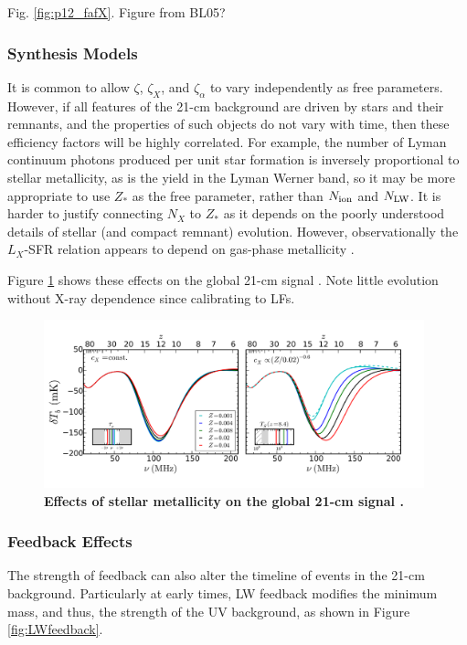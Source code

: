{\color{red} Fig. \ref{fig:p12_fafX}. Figure from BL05?}


\subsubsection{Synthesis Models}
It is common to allow $\zeta$, $\zeta_X$, and $\zeta_{\alpha}$ to vary independently as free parameters. However, if all features of the 21-cm background are driven by stars and their remnants, and the properties of such objects do not vary with time, then these efficiency factors will be highly correlated. For example, the number of Lyman continuum photons produced per unit star formation is inversely proportional to stellar metallicity, as is the yield in the Lyman Werner band, so it may be more appropriate to use $Z_{\ast}$ as the free parameter, rather than $N_{\text{ion}}$ and $N_{\text{LW}}$. It is harder to justify connecting $N_X$ to $Z_{\ast}$ as it depends on the poorly understood details of stellar (and compact remnant) evolution. However, observationally the $L_X$-SFR relation appears to depend on gas-phase metallicity \cite{Brorby2016}. 

Figure \ref{fig:gs_metallicity} shows these effects on the global 21-cm signal \cite{Mirocha2017}. {\color{red} Note little evolution without X-ray dependence since calibrating to LFs.}

\begin{figure}[]
\begin{center}
\includegraphics[width=0.98\textwidth]{Mirocha/mirocha2017_fig5.pdf}
\end{center}
\caption{{\bf Effects of stellar metallicity on the global 21-cm signal \cite{Mirocha2017}.}}
\label{fig:gs_metallicity}
\end{figure}


\subsubsection{Feedback Effects}
The strength of feedback can also alter the timeline of events in the 21-cm background. Particularly at early times, LW feedback modifies the minimum mass, and thus, the strength of the UV background, as shown in Figure \ref{fig:LWfeedback}.

